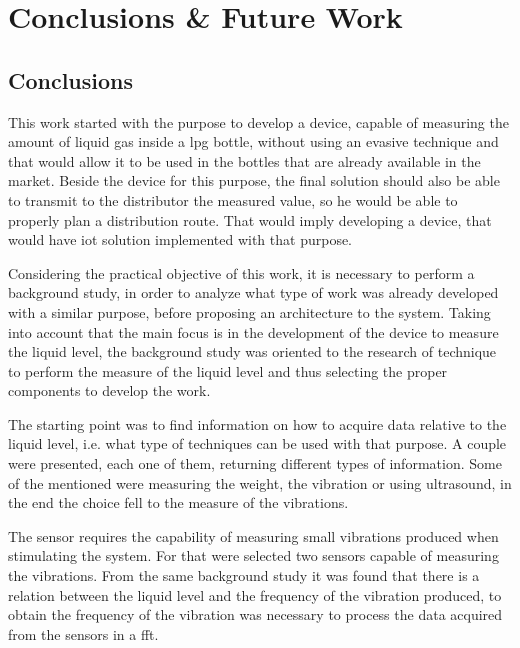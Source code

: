 \cleardoublepage
\chapter{Conclusions \& Future Work}\label{chap:finalremarks}
\label{sec:Conclusions}
\label{sec:FutureWork}
\section{Conclusions}
This work started with the purpose to develop a device, capable of measuring the amount of liquid gas inside a \acrshort{lpg} bottle, without using an evasive technique and that would allow it to be used in the bottles that  are already available in the market. Beside the device for this purpose, the final solution should also be able to transmit to the distributor the measured value, so he would be able to properly plan a distribution route. That would imply developing a device, that would have \acrshort{iot} solution implemented with that purpose. 

Considering the practical objective of this work, it is necessary to perform a background study, in order to analyze what type of work was already developed with a similar purpose, before proposing an architecture to the system. Taking into account that the main focus is in the development of the device to measure the liquid level, the background study was oriented to the research of technique to perform the measure of the liquid level and thus selecting the proper components to develop the work.

The starting point was to find information on how to acquire data relative to the liquid level, i.e. what type of techniques can be used with that purpose. A couple were presented, each one of them, returning different types of information. Some of the mentioned were measuring the weight, the vibration or using ultrasound, in the end the choice fell to the measure of the vibrations. 

The sensor requires the capability of measuring small vibrations produced when stimulating the system. For that were selected two sensors capable of measuring the vibrations. From the same background study it was found that there is a relation between the liquid level and the frequency of the vibration produced, to obtain the frequency of the vibration was necessary to process the data acquired from the sensors in a \acrshort{fft}.

